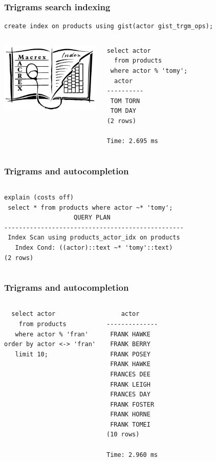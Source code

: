 \documentclass{beamer}
\begin{document}
\begin{frame}[fragile]
  \frametitle{Trigrams search indexing}

\begin{verbatim}
create index on products using gist(actor gist_trgm_ops);
\end{verbatim}
\vfill

\begin{columns}
\begin{center}
  \includegraphics[height=9em]{macrex-index.png}
\end{center}
\begin{verbatim}
select actor
  from products
 where actor % 'tomy';
  actor   
----------
 TOM TORN
 TOM DAY
(2 rows)

Time: 2.695 ms
\end{verbatim}  
\end{columns}
\end{frame}

\begin{frame}[fragile]
  \frametitle{Trigrams and autocompletion}

  \vfill

\begin{columns}
\begin{verbatim}
explain (costs off)
 select * from products where actor ~* 'tomy';
                   QUERY PLAN                    
-------------------------------------------------
 Index Scan using products_actor_idx on products
   Index Cond: ((actor)::text ~* 'tomy'::text)
(2 rows)
\end{verbatim}  
\end{columns}
\end{frame}

\begin{frame}[fragile]
  \frametitle{Trigrams and autocompletion}

  \vfill

\begin{columns}
\begin{verbatim}
  select actor
    from products
   where actor % 'fran'
order by actor <-> 'fran'
   limit 10;
\end{verbatim}  
\begin{verbatim}
    actor     
--------------
 FRANK HAWKE
 FRANK BERRY
 FRANK POSEY
 FRANK HAWKE
 FRANCES DEE
 FRANK LEIGH
 FRANCES DAY
 FRANK FOSTER
 FRANK HORNE
 FRANK TOMEI
(10 rows)

Time: 2.960 ms
\end{verbatim}  
\end{columns}
\end{frame}
\end{document}
